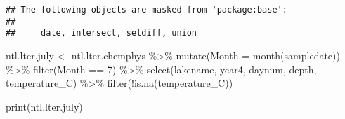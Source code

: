 \documentclass[
]{article}
\newenvironment{Shaded}{\begin{snugshade}}{\end{snugshade}}
\newcommand{\AttributeTok}[1]{\textcolor[rgb]{0.77,0.63,0.00}{#1}}
\newcommand{\DecValTok}[1]{\textcolor[rgb]{0.00,0.00,0.81}{#1}}
\newcommand{\FunctionTok}[1]{\textcolor[rgb]{0.00,0.00,0.00}{#1}}
\newcommand{\NormalTok}[1]{#1}
\newcommand{\OtherTok}[1]{\textcolor[rgb]{0.56,0.35,0.01}{#1}}
\newcommand{\SpecialCharTok}[1]{\textcolor[rgb]{0.00,0.00,0.00}{#1}}
\begin{document}
\begin{verbatim}
## The following objects are masked from 'package:base':
## 
##     date, intersect, setdiff, union
\end{verbatim}

\begin{Shaded}
\begin{Highlighting}[]
\NormalTok{ntl.lter.july }\OtherTok{\textless{}{-}}\NormalTok{ ntl.lter.chemphys }\SpecialCharTok{\%\textgreater{}\%}
  \FunctionTok{mutate}\NormalTok{(}\AttributeTok{Month =} \FunctionTok{month}\NormalTok{(sampledate)) }\SpecialCharTok{\%\textgreater{}\%}
  \FunctionTok{filter}\NormalTok{(Month }\SpecialCharTok{==} \DecValTok{7}\NormalTok{) }\SpecialCharTok{\%\textgreater{}\%}
  \FunctionTok{select}\NormalTok{(lakename, year4, daynum, depth, temperature\_C) }\SpecialCharTok{\%\textgreater{}\%}
  \FunctionTok{filter}\NormalTok{(}\SpecialCharTok{!}\FunctionTok{is.na}\NormalTok{(temperature\_C)) }

\FunctionTok{print}\NormalTok{(ntl.lter.july)}
\end{Highlighting}
\end{Shaded}
\end{document}

